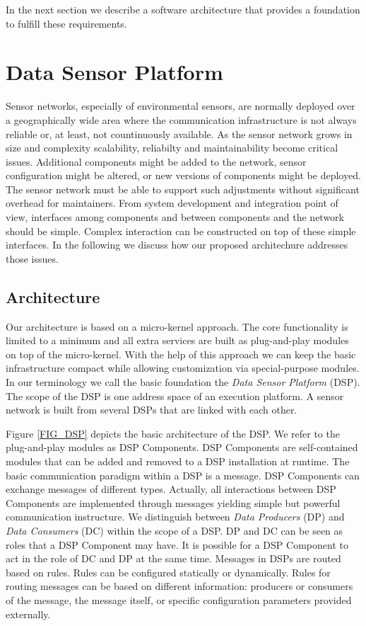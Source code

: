 \documentclass[conference]{IEEEtran}
\begin{document}
In the next section we describe a software architecture that provides
a foundation to fulfill these requirements.


\section{Data Sensor Platform}
\label{SEC_DSP}

Sensor networks, especially of environmental sensors, are normally
deployed over a geographically wide area where the communication
infrastructure is not always reliable or, at least, not countinuously
available. As the sensor network grows in size and complexity
scalability, reliabilty and maintainability become critical issues.
Additional components might be added to the network, sensor
configuration might be altered, or new versions of components might be
deployed. The sensor network must be able to support such adjustments
without significant overhead for maintainers.  From system
development and integration point of view, interfaces among components
and between components and the network should be simple. Complex
interaction can be constructed on top of these simple interfaces.  In
the following we discuss how our proposed architechure addresses those
issues.

\subsection{Architecture}

Our architecture is based on a micro-kernel approach. The core
functionality is limited to a minimum and all extra services are built
as plug-and-play modules on top of the micro-kernel. With the help of
this approach we can keep the basic infrastructure compact while
allowing customization via special-purpose modules. In our terminology
we call the basic foundation the \emph{Data Sensor Platform}
(DSP). The scope of the DSP is one address space of an execution
platform. A sensor network is built from several DSPs that are linked
with each other.

Figure \ref{FIG_DSP} depicts the basic architecture of the DSP. We
refer to the plug-and-play modules as DSP Components. DSP Components
are self-contained modules that can be added and removed to a DSP
installation at runtime. The basic communication paradigm within a DSP
is a message. DSP Components can exchange messages of different types.
Actually, all interactions between DSP Components are implemented
through messages yielding simple but powerful communication
instructure.  We distinguish between \emph{Data Producers} (DP) and
\emph{Data Consumers} (DC) within the scope of a DSP. DP and DC can be
seen as roles that a DSP Component may have. It is possible for a DSP
Component to act in the role of DC and DP at the same time. Messages
in DSPs are routed based on rules. Rules can be configured statically
or dynamically. Rules for routing messages can be based on different
information: producers or consumers of the message, the message
itself, or specific configuration parameters provided externally.
\end{document}
